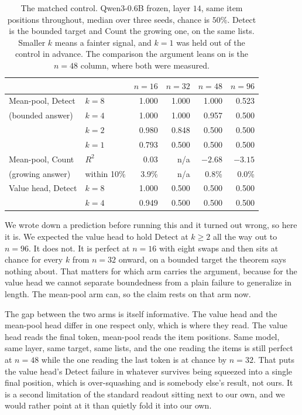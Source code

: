 \documentclass[10pt]{article}
\theoremstyle{definition}
\begin{document}
\begin{table}[htbp]
\centering
\caption{The matched control. Qwen3-0.6B frozen, layer $14$, same item
positions throughout, median over three seeds, chance is $50\%$. Detect is
the bounded target and Count the growing one, on the same lists. Smaller
$k$ means a fainter signal, and $k = 1$ was held out of the control in
advance. The comparison the argument leans on is the $n = 48$ column, where
both were measured.}
\label{tab:twin}
\small
\begin{tabular}{@{}llrrrr@{}}
\toprule
& & $n = 16$ & $n = 32$ & $n = 48$ & $n = 96$ \\
\midrule
Mean-pool, Detect & $k = 8$ & 1.000 & 1.000 & 1.000 & 0.523 \\
(bounded answer) & $k = 4$ & 1.000 & 1.000 & 0.957 & 0.500 \\
 & $k = 2$ & 0.980 & 0.848 & 0.500 & 0.500 \\
 & $k = 1$ & 0.793 & 0.500 & 0.500 & 0.500 \\
\midrule
Mean-pool, Count & $R^2$ & 0.03 & n/a & $-2.68$ & $-3.15$ \\
(growing answer) & within 10\% & 3.9\% & n/a & 0.8\% & 0.0\% \\
\midrule
Value head, Detect & $k = 8$ & 1.000 & 0.500 & 0.500 & 0.500 \\
 & $k = 4$ & 0.949 & 0.500 & 0.500 & 0.500 \\
\bottomrule
\end{tabular}
\end{table}

We wrote down a prediction before running this and it turned out wrong, so
here it is. We expected the value head to hold Detect at $k \ge 2$ all the
way out to $n = 96$. It does not. It is perfect at $n = 16$ with eight
swaps and then sits at chance for every $k$ from $n = 32$ onward, on a
bounded target the theorem says nothing about. That matters for which arm
carries the argument, because for the value head we cannot separate boundedness from a plain failure to generalize in length. The mean-pool arm
can, so the claim rests on that arm now.

The gap between the two arms is itself informative. The value head and the
mean-pool head differ in one respect only, which is where they read. The
value head reads the final token, mean-pool reads the item positions. Same
model, same layer, same target, same lists, and the one reading the items
is still perfect at $n = 48$ while the one reading the last token is at
chance by $n = 32$. That puts the value head's Detect failure in whatever
survives being squeezed into a single final position, which is
over-squashing and is somebody else's result, not ours. It is a second
limitation of the standard readout sitting next to our own, and we would rather point at it than quietly fold it into our own.
\end{document}
